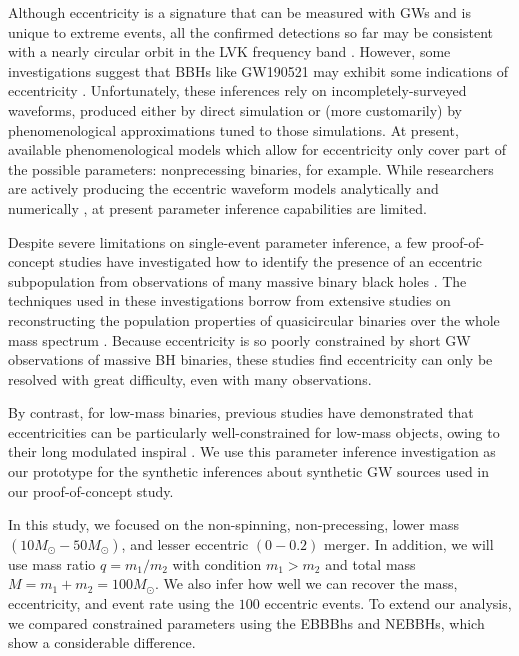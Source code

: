 \documentclass[twocolumn,prd,nofootinbib]{revtex4}
\begin{document}
Although eccentricity is a signature that can be measured with GWs and is unique to extreme events, all the confirmed detections so far may be consistent with a nearly circular orbit in the LVK frequency band \cite{Isobel-2022,hector-jake-2022}. However, some investigations suggest that  BBHs like GW190521 may exhibit some indications of eccentricity \cite{Gamba_2022_GW190521_dynamical,yumeng-2023}.
Unfortunately, these inferences rely on incompletely-surveyed waveforms, produced either by direct simulation or (more customarily) by phenomenological approximations tuned to those simulations.  At present, available phenomenological models which allow for eccentricity only cover part of the possible parameters: nonprecessing binaries, for example. 
While researchers are actively producing the eccentric waveform models analytically \cite{Huerta-2014} and numerically \cite{gold-2016,hinder-2010, Healy-2022, Alessandro-2022, Campanelli-2009}, at present parameter inference capabilities are limited. 




Despite severe limitations on single-event parameter inference, a few proof-of-concept studies have investigated how to identify the presence of an eccentric subpopulation from observations of many massive binary black holes  
\cite{lower-2018-ecc-pop,Fang-2019,wu-2020}.
The techniques used in these investigations borrow from extensive studies on reconstructing the population properties of quasicircular binaries over the whole mass spectrum
\cite{Dan_2019, Michael-2015, Mandel_2017_Errors, samsing-hamers-2019,  belczynski-2016, Colm-2017, Akinobu-2017, Michael-zevin-2017, farr-2017-nature, Richard-2017-natal-kicks, Dan-Richard-2018,Abbot-2019-pop}.
Because eccentricity is so poorly constrained by short GW observations of massive BH binaries, these studies find eccentricity can only be resolved with great difficulty, even with many observations.

By contrast, for low-mass binaries, previous studies have  demonstrated that eccentricities can be particularly well-constrained for low-mass objects, owing to their long modulated inspiral   \cite{favata-scaling-2022}.  We use this parameter inference investigation as our prototype for the synthetic inferences about synthetic GW sources used in our proof-of-concept study.   

In this study, we focused on the non-spinning, non-precessing, lower mass $(10 M_\odot - 50 M_\odot)$, and lesser eccentric $(0 - 0.2)$ merger. In addition, we will use mass ratio $q = m_1 / m_2 $ with condition $m_1>m_2$ and total mass $M = m_1 + m_2 = 100 M_\odot$. We also infer how well we can recover the mass, eccentricity, and event rate using the $100$ eccentric events. To extend our analysis, we compared constrained parameters using the EBBBhs and NEBBHs, which show a considerable difference.
\end{document}
